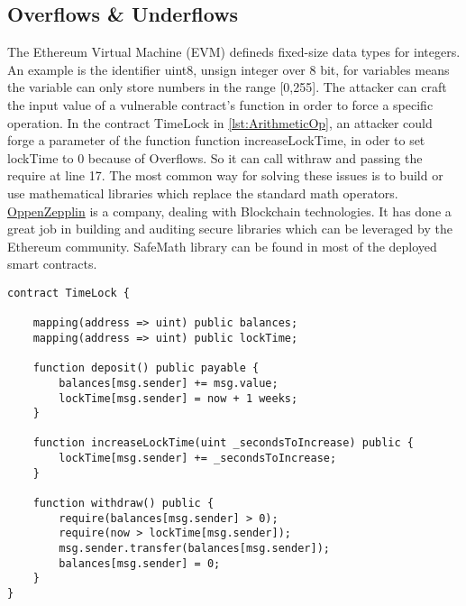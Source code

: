 \documentclass[a4paper,sigconf, language=french,
language=german, language=spanish, language=english]{acmart}
\begin{document}
\subsection{Overflows \& Underflows} The Ethereum Virtual Machine (EVM) defineds fixed-size data types for integers. 
An example is the identifier uint8, unsign integer over 8 bit, for variables means the variable can only store numbers in the range [0,255].
The attacker can craft the input value of a vulnerable contract's function in order to force a specific operation. 
In the contract TimeLock in \autoref{lst:ArithmeticOp}, an attacker could forge a parameter of the function function increaseLockTime, 
in oder to set lockTime to 0 because of Overflows. So it can call withraw and passing the require at line 17.
The most common way for solving these issues is to build or use mathematical libraries which replace the standard math operators. 
\href{https://www.openzeppelin.com/}{OppenZepplin} is a company, dealing with Blockchain technologies. It has done a great job in building and auditing secure libraries which can be leveraged by the Ethereum community.
SafeMath library can be found in most of the deployed smart contracts.
\begin{lstlisting}[language=Solidity,caption={Overflows \& Underflows},label={lst:ArithmeticOp}]
contract TimeLock {
  
    mapping(address => uint) public balances;
    mapping(address => uint) public lockTime;
    
    function deposit() public payable {
        balances[msg.sender] += msg.value;
        lockTime[msg.sender] = now + 1 weeks;
    }
    
    function increaseLockTime(uint _secondsToIncrease) public {
        lockTime[msg.sender] += _secondsToIncrease;
    }
    
    function withdraw() public {
        require(balances[msg.sender] > 0);
        require(now > lockTime[msg.sender]);
        msg.sender.transfer(balances[msg.sender]);
        balances[msg.sender] = 0;
    }
}
\end{lstlisting}
\end{document}

